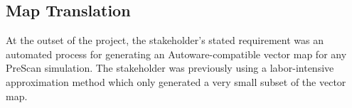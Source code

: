 \documentclass[12pt,twoside]{article}
\begin{document}


\subsection{Map Translation}
At the outset of the project, the stakeholder's stated requirement was an automated process for generating an Autoware-compatible vector map for any PreScan simulation. The stakeholder was previously using a labor-intensive approximation method which only generated a very small subset of the vector map.
\end{document}

